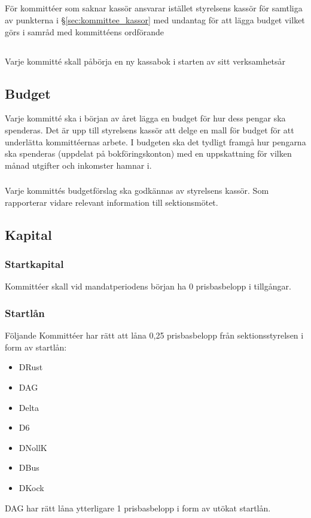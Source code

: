 \documentclass[a4paper, 10pt]{article}
\begin{document}
\subsection{}
För kommittéer som saknar kassör ansvarar istället styrelsens kassör för samtliga av punkterna i \S\ref{sec:kommittee_kassor} med undantag för att lägga budget vilket görs i samråd med kommittéens ordförande
\subsection{}
Varje kommitté skall påbörja en ny kassabok i starten av sitt verksamhetsår
\subsection{Budget}
\label{sec:budget}
Varje kommitté ska i början av året lägga en budget för hur dess pengar ska spenderas. Det är upp till styrelsens kassör att delge en mall för budget för att underlätta kommittéernas arbete. I budgeten ska det tydligt framgå hur pengarna ska spenderas (uppdelat på bokföringskonton) med en uppskattning för vilken månad utgifter och inkomster hamnar i. 

\subsubsection{}
Varje kommittés budgetförslag ska godkännas av styrelsens kassör. Som rapporterar vidare relevant information till sektionsmötet.


\subsection{Kapital}
\label{sec:sektionsforeningar_startkapital}
\subsubsection{Startkapital}
Kommittéer skall vid mandatperiodens början ha 0 prisbasbelopp i tillgångar. 
\subsubsection{Startlån}
Följande Kommittéer har rätt att låna 0,25 prisbasbelopp från sektionsstyrelsen i form av startlån: 
\begin{itemize}
  \item DRust
  \item DAG
  \item Delta
  \item D6
  \item DNollK
  \item DBus
  \item DKock
\end{itemize}
DAG har rätt låna ytterligare 1 prisbasbelopp i form av utökat startlån.
\end{document}
